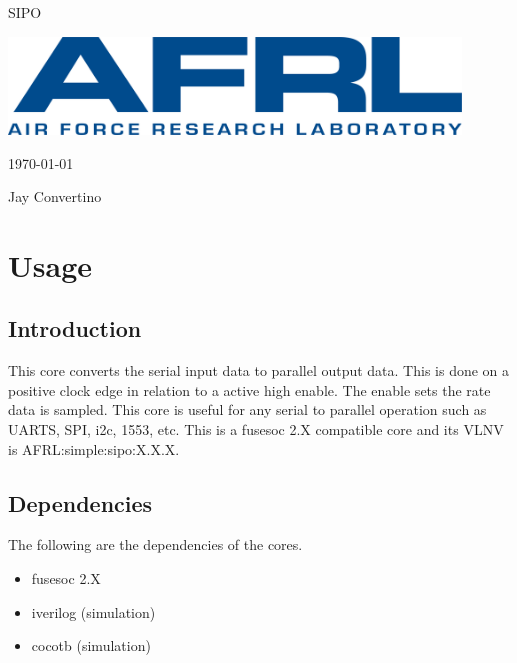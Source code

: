 \begin{titlepage}
  \begin{center}

  {\Huge SIPO}

  \vspace{25mm}

  \includegraphics[width=0.90\textwidth,height=\textheight,keepaspectratio]{img/AFRL.png}

  \vspace{25mm}

  \today

  \vspace{15mm}

  {\Large Jay Convertino}

  \end{center}
\end{titlepage}

\tableofcontents

\newpage

\section{Usage}

\subsection{Introduction}

\par
This core converts the serial input data to parallel output data. This is done on a positive clock edge in relation to a active high enable.
The enable sets the rate data is sampled. This core is useful for any serial to parallel operation such as UARTS, SPI, i2c, 1553, etc.
This is a fusesoc 2.X compatible core and its VLNV is
AFRL:simple:sipo:X.X.X.

\subsection{Dependencies}

\par
The following are the dependencies of the cores.

\begin{itemize}
  \item fusesoc 2.X
  \item iverilog (simulation)
  \item cocotb (simulation)
\end{itemize}

